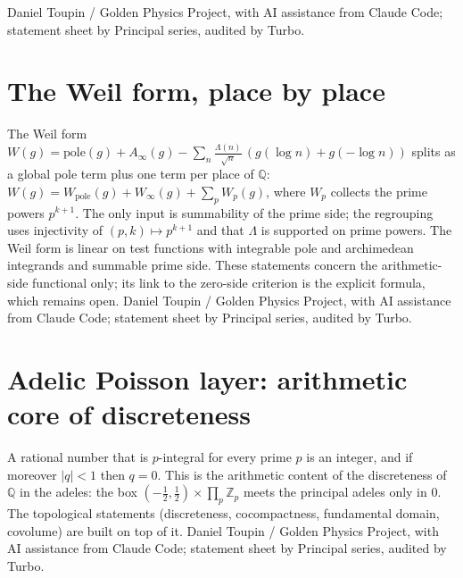 \documentclass{report}
\theoremstyle{definition}
\begin{document}
\begin{itemize}
\begin{itemize}
Daniel Toupin / Golden Physics Project, with AI assistance from Claude Code; statement sheet by Principal series, audited by Turbo.

\section{The Weil form, place by place}
The Weil form $W(g)=\mathrm{pole}(g)+A_\infty(g)-\sum_n\frac{\Lambda(n)}{\sqrt n}\,(g(\log n)+g(-\log n))$ splits as a global pole term plus one term per place of $\mathbb Q$: $W(g)=W_{\mathrm{pole}}(g)+W_\infty(g)+\sum_p W_p(g)$, where $W_p$ collects the prime powers $p^{k+1}$. The only input is summability of the prime side; the regrouping uses injectivity of $(p,k)\mapsto p^{k+1}$ and that $\Lambda$ is supported on prime powers. The Weil form is linear on test functions with integrable pole and archimedean integrands and summable prime side. These statements concern the arithmetic-side functional only; its link to the zero-side criterion is the explicit formula, which remains open.
Daniel Toupin / Golden Physics Project, with AI assistance from Claude Code; statement sheet by Principal series, audited by Turbo.

\section{Adelic Poisson layer: arithmetic core of discreteness}
A rational number that is $p$-integral for every prime $p$ is an integer, and if moreover $|q|<1$ then $q=0$. This is the arithmetic content of the discreteness of $\mathbb Q$ in the adeles: the box $(-\tfrac12,\tfrac12)\times\prod_p\mathbb Z_p$ meets the principal adeles only in $0$. The topological statements (discreteness, cocompactness, fundamental domain, covolume) are built on top of it.
Daniel Toupin / Golden Physics Project, with AI assistance from Claude Code; statement sheet by Principal series, audited by Turbo.

\end{itemize}
\end{itemize}
\end{document}
